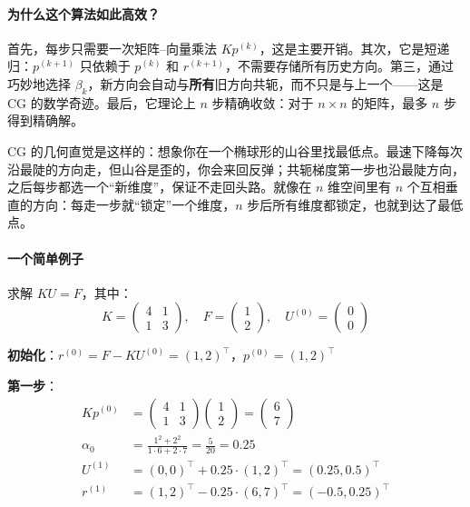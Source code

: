 \paragraph{为什么这个算法如此高效？}

首先，每步只需要一次矩阵--向量乘法 $Kp^{(k)}$，这是主要开销。其次，它是短递归：$p^{(k+1)}$ 只依赖于 $p^{(k)}$ 和 $r^{(k+1)}$，不需要存储所有历史方向。第三，通过巧妙地选择 $\beta_k$，新方向会自动与\textbf{所有}旧方向共轭，而不只是与上一个——这是 CG 的数学奇迹。最后，它理论上 $n$ 步精确收敛：对于 $n \times n$ 的矩阵，最多 $n$ 步得到精确解。

\begin{physicalmeaning}
CG 的几何直觉是这样的：想象你在一个椭球形的山谷里找最低点。最速下降每次沿最陡的方向走，但山谷是歪的，你会来回反弹；共轭梯度第一步也沿最陡方向，之后每步都选一个“新维度”，保证不走回头路。就像在 $n$ 维空间里有 $n$ 个互相垂直的方向：每走一步就“锁定”一个维度，$n$ 步后所有维度都锁定，也就到达了最低点。
\end{physicalmeaning}

\paragraph{一个简单例子}

求解 $KU = F$，其中：
\[
K = \begin{pmatrix} 4 & 1 \\ 1 & 3 \end{pmatrix}, \quad F = \begin{pmatrix} 1 \\ 2 \end{pmatrix}, \quad U^{(0)} = \begin{pmatrix} 0 \\ 0 \end{pmatrix}
\]

\textbf{初始化}：$r^{(0)} = F - KU^{(0)} = (1, 2)^\top$，$p^{(0)} = (1, 2)^\top$

\textbf{第一步}：
\begin{align*}
Kp^{(0)} &= \begin{pmatrix} 4 & 1 \\ 1 & 3 \end{pmatrix} \begin{pmatrix} 1 \\ 2 \end{pmatrix} = \begin{pmatrix} 6 \\ 7 \end{pmatrix} \\
\alpha_0 &= \frac{1^2 + 2^2}{1 \cdot 6 + 2 \cdot 7} = \frac{5}{20} = 0.25 \\
U^{(1)} &= (0, 0)^\top + 0.25 \cdot (1, 2)^\top = (0.25, 0.5)^\top \\
r^{(1)} &= (1, 2)^\top - 0.25 \cdot (6, 7)^\top = (-0.5, 0.25)^\top
\end{align*}

